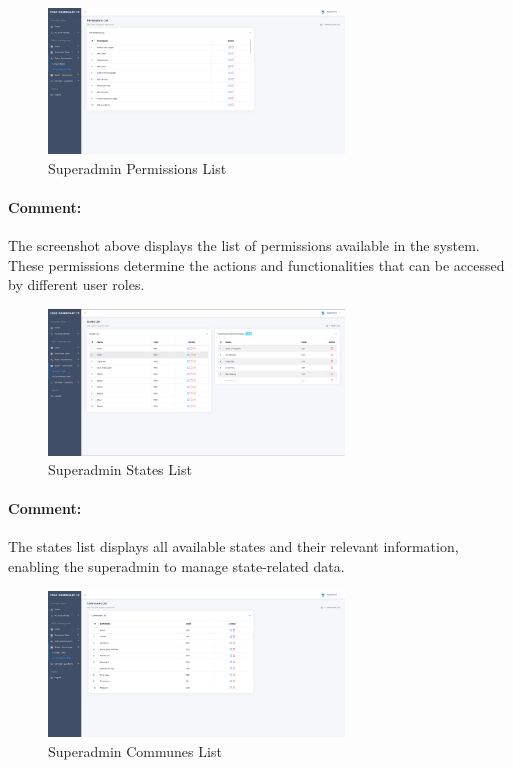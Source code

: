 \begin{itemize}
\begin{figure}[htbp]
    \centering
    \includegraphics[width=0.7\textwidth]{SCREENSHOTS/superadmin/permissions_list.png}
    \caption{Superadmin Permissions List}
    \label{fig:permissions-list}
  \end{figure}
  \paragraph{Comment:} The screenshot above displays the list of permissions available in the system. These permissions determine the actions and functionalities that can be accessed by different user roles.

  \begin{figure}[htbp]
    \centering
    \includegraphics[width=0.7\textwidth]{SCREENSHOTS/superadmin/states_communes.png}
    \caption{Superadmin States List}
    \label{fig:states-list}
\end{figure}
\paragraph{Comment:} The states list displays all available states and their relevant information, enabling the superadmin to manage state-related data.
\newpage

\begin{figure}[htbp]
    \centering
    \includegraphics[width=0.7\textwidth]{SCREENSHOTS/superadmin/communes.png}
  \caption{Superadmin Communes List}
  \label{fig:communes-list}
\end{figure}

\end{itemize}
